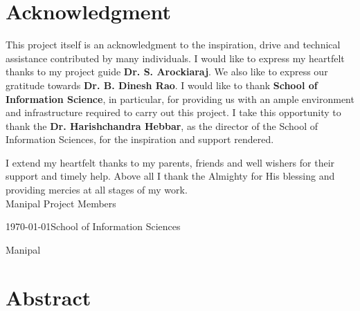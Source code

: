 \documentclass{mainreport}
\begin{document}
\maketitle
\makecertificate

\parindent 10mm
\chapter*{Acknowledgment}\label{ack}
{\label{ack} 

\hspace{6mm} This project itself is an acknowledgment to the inspiration, drive and technical
assistance contributed by many individuals. I would like to express my heartfelt thanks to my project guide {\bf Dr. S. Arockiaraj}. We also like to express our gratitude towards {\bf Dr. B. Dinesh Rao}.
I would like to thank {\bf School of Information Science}, in particular, for providing us with an ample environment and
infrastructure required to carry out this project. I take this opportunity to thank
the {\bf Dr. Harishchandra Hebbar}, as the director of the School of Information Sciences, for the inspiration and support rendered.

I extend my heartfelt thanks to my parents, friends and well wishers for their support and timely help. Above all I thank the Almighty for His blessing and providing mercies at all stages of my work. \\[2cm]




\noindent Manipal \hfill Project Members

\noindent \today \hfill School of Information Sciences

 \hfill Manipal





}

\chapter*{Abstract}\label{Abstract}
\end{document}
